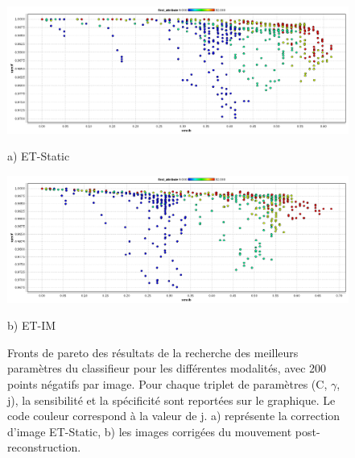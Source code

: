 \begin{figure}[h!]

\begin{center}
 \includegraphics[width=14cm]{images/pareto_mod_Static19.png}

{\small a) ET-Static}
\vspace{0.5cm}

 \includegraphics[width=14cm]{images/pareto_mod_IM19.png}

{\small b) ET-IM}

\end{center}
 \caption{\label{fig:paretoModalite19_1} Fronts de pareto des résultats de la recherche des meilleurs paramètres du classifieur pour les différentes modalités, avec 200 points négatifs par image. Pour chaque triplet de paramètres (C, $\gamma$, j), la sensibilité et la spécificité sont reportées sur le graphique. Le code couleur correspond à la valeur de j. a) représente la correction d'image ET-Static, b) les images corrigées du mouvement post-reconstruction.}
\end{figure}


